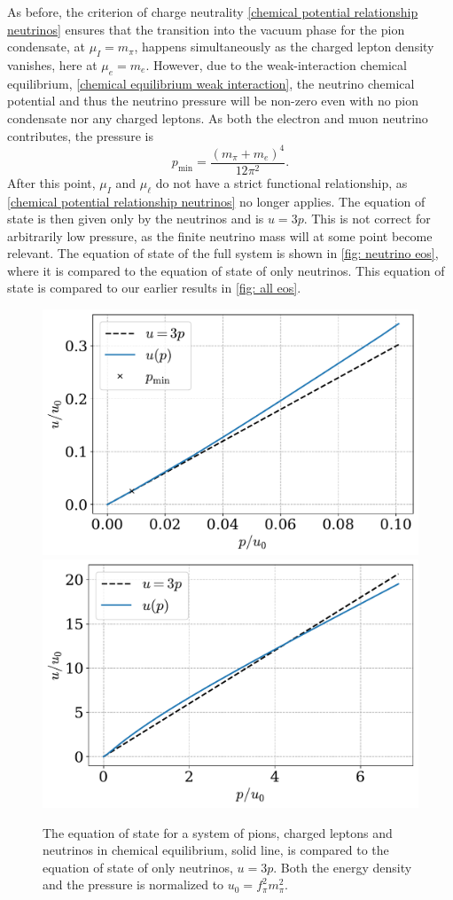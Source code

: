 As before, the criterion of charge neutrality \autoref{chemical potential relationship neutrinos} ensures that the transition into the vacuum phase for the pion condensate, at $\mu_I = m_\pi$, happens simultaneously as the charged lepton density vanishes, here at $\mu_e = m_e$.
However, due to the weak-interaction chemical equilibrium, \autoref{chemical equilibrium weak interaction}, the neutrino chemical potential and thus the neutrino pressure will be non-zero even with no pion condensate nor any charged leptons. 
As both the electron and muon neutrino contributes, the pressure is
%
\begin{equation}
    \label{p min}
    p_\text{min} = \frac{(m_\pi+m_e)^4}{12 \pi^2}.
\end{equation}
%
After this point, $\mu_I$ and $\mu_\ell$ do not have a strict functional relationship, as \autoref{chemical potential relationship neutrinos} no longer applies.
The equation of state is then given only by the neutrinos and is $u = 3p$.
This is not correct for arbitrarily low pressure, as the finite neutrino mass will at some point become relevant.
The equation of state of the full system is shown in \autoref{fig: neutrino eos}, where it is compared to the equation of state of only neutrinos.
This equation of state is compared to our earlier results in \autoref{fig: all eos}.

\begin{figure}[!htb]
    \centering
    \includegraphics[width=.49\textwidth]{../scripts/figurer/neutrino_eos2.pdf}
    \includegraphics[width=.49\textwidth]{../scripts/figurer/neutrino_eos.pdf}
    \caption{
        The equation of state for a system of pions, charged leptons and neutrinos in chemical equilibrium, solid line, is compared to the equation of state of only neutrinos, $u = 3 p$.
        Both the energy density and the pressure is normalized to $u_0 = f_\pi^2 m_\pi^2$.
    }
    \label{fig: neutrino eos}
\end{figure}


